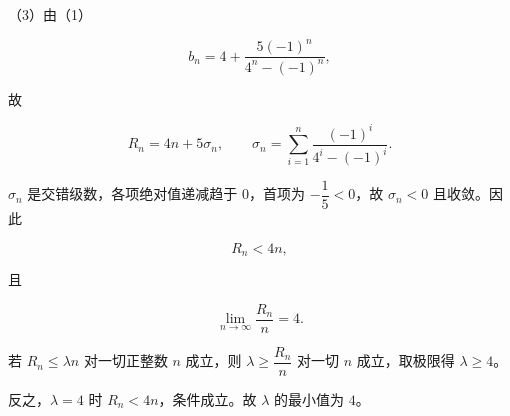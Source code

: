\begin{answer}
（3）由（1）

\nopagebreak[4]
\[b_n=4+\frac{5(-1)^n}{4^n-(-1)^n},\]

故

\nopagebreak[4]
\[R_n=4n+5\sigma_n,\qquad
\sigma_n=\sum_{i=1}^{n}\frac{(-1)^i}{4^i-(-1)^i}.\]

$\sigma_n$ 是交错级数，各项绝对值递减趋于 $0$，首项为 $-\dfrac15<0$，故 $\sigma_n<0$ 且收敛。因此

\nopagebreak[4]
\[R_n<4n ,\]

且

\nopagebreak[4]
\[\lim_{n\to\infty}\frac{R_n}{n}=4 .\]

若 $R_n\leqslant\lambda n$ 对一切正整数 $n$ 成立，则 $\lambda\geqslant\dfrac{R_n}{n}$ 对一切 $n$ 成立，取极限得 $\lambda\geqslant4$。

反之，$\lambda=4$ 时 $R_n<4n$，条件成立。故 $\lambda$ 的最小值为 $4$。


\end{answer}